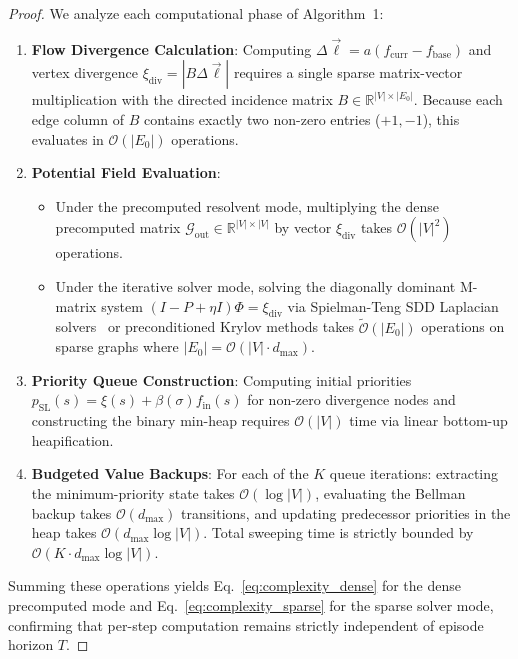 \documentclass[11pt,a4paper]{article}
\begin{document}
\begin{proof}
We analyze each computational phase of Algorithm~1:
\begin{enumerate}
    \item \textbf{Flow Divergence Calculation}: Computing $\Delta \vec{\ell} = a (f_{\text{curr}} - f_{\text{base}})$ and vertex divergence $\xi_{\text{div}} = |B \Delta \vec{\ell}|$ requires a single sparse matrix-vector multiplication with the directed incidence matrix $B \in \mathbb{R}^{|V| \times |E_0|}$. Because each edge column of $B$ contains exactly two non-zero entries ($+1, -1$), this evaluates in $\mathcal{O}(|E_0|)$ operations.
    \item \textbf{Potential Field Evaluation}: 
    \begin{itemize}
        \item Under the precomputed resolvent mode, multiplying the dense precomputed matrix $\mathcal{G}_{\text{out}} \in \mathbb{R}^{|V| \times |V|}$ by vector $\xi_{\text{div}}$ takes $\mathcal{O}(|V|^2)$ operations.
        \item Under the iterative solver mode, solving the diagonally dominant M-matrix system $(I - P + \eta I)\Phi = \xi_{\text{div}}$ via Spielman-Teng SDD Laplacian solvers~\cite{spielman2025sagt} or preconditioned Krylov methods takes $\widetilde{\mathcal{O}}(|E_0|)$ operations on sparse graphs where $|E_0| = \mathcal{O}(|V| \cdot d_{\max})$.
    \end{itemize}
    \item \textbf{Priority Queue Construction}: Computing initial priorities $p_{\text{SL}}(s) = \xi(s) + \beta(\sigma) f_{\text{in}}(s)$ for non-zero divergence nodes and constructing the binary min-heap requires $\mathcal{O}(|V|)$ time via linear bottom-up heapification.
    \item \textbf{Budgeted Value Backups}: For each of the $K$ queue iterations: extracting the minimum-priority state takes $\mathcal{O}(\log |V|)$, evaluating the Bellman backup takes $\mathcal{O}(d_{\max})$ transitions, and updating predecessor priorities in the heap takes $\mathcal{O}(d_{\max} \log |V|)$. Total sweeping time is strictly bounded by $\mathcal{O}(K \cdot d_{\max} \log |V|)$.
\end{enumerate}
Summing these operations yields Eq.~\eqref{eq:complexity_dense} for the dense precomputed mode and Eq.~\eqref{eq:complexity_sparse} for the sparse solver mode, confirming that per-step computation remains strictly independent of episode horizon $T$.
\end{proof}
\end{document}

